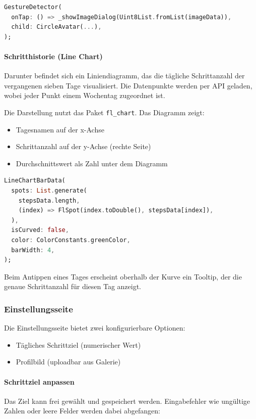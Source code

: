 \documentclass[11pt,a4paper]{article}
\begin{document}
\begin{lstlisting}[language=Dart, caption=Bild als Dialog anzeigen]
GestureDetector(
  onTap: () => _showImageDialog(Uint8List.fromList(imageData)),
  child: CircleAvatar(...),
);
\end{lstlisting}

\paragraph{Schritthistorie (Line Chart)}
Darunter befindet sich ein Liniendiagramm, das die tägliche Schrittanzahl der vergangenen sieben Tage visualisiert. Die Datenpunkte werden per API geladen, wobei jeder Punkt einem Wochentag zugeordnet ist. 

Die Darstellung nutzt das Paket \texttt{fl\_chart}. Das Diagramm zeigt:
\begin{itemize}
  \item Tagesnamen auf der x-Achse
  \item Schrittanzahl auf der y-Achse (rechte Seite)
  \item Durchschnittswert als Zahl unter dem Diagramm
\end{itemize}

\begin{lstlisting}[language=Dart, caption=Diagrammkonfiguration für Schrittverlauf]
LineChartBarData(
  spots: List.generate(
    stepsData.length,
    (index) => FlSpot(index.toDouble(), stepsData[index]),
  ),
  isCurved: false,
  color: ColorConstants.greenColor,
  barWidth: 4,
);
\end{lstlisting}

Beim Antippen eines Tages erscheint oberhalb der Kurve ein Tooltip, der die genaue Schrittanzahl für diesen Tag anzeigt.

\subsubsection{Einstellungsseite}

Die Einstellungsseite bietet zwei konfigurierbare Optionen:
\begin{itemize}
  \item Tägliches Schrittziel (numerischer Wert)
  \item Profilbild (uploadbar aus Galerie)
\end{itemize}

\paragraph{Schrittziel anpassen}
Das Ziel kann frei gewählt und gespeichert werden. Eingabefehler wie ungültige Zahlen oder leere Felder werden dabei abgefangen:
\end{document}
